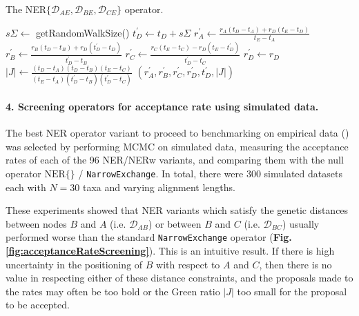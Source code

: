 \documentclass[10pt,letterpaper]{article}
\begin{document}
\begin{algorithm}
\caption{The NER$\{ \mathcal{D}_{AE}, \mathcal{D}_{BE}, \mathcal{D}_{CE} \}$ operator.}
\begin{algorithmic}[1]


	\State
    \State $s\Sigma \leftarrow $ getRandomWalkSize() 
    \State $t_D^\prime \leftarrow t_D + s\Sigma$ 
    \State
    \State $r_A^\prime \leftarrow \frac{r_A(t_D - t_A) + r_D(t_E - t_D)}{t_E - t_A}$ 
    \State $r_B^\prime \leftarrow \frac{r_B(t_D - t_B) + r_D(t_D^\prime - t_D)}{t_D^\prime - t_B}$
    \State $r_C^\prime \leftarrow \frac{r_C(t_E - t_C) - r_D(t_E - t_D^\prime)}{t_D^\prime - t_C}$
    \State $r_D^\prime \leftarrow r_D$
    \State
    \State $|J| \leftarrow \frac{(t_D - t_A)(t_D - t_B)(t_E - t_C)}{(t_E - t_A)(t_D^\prime - t_B)(t_D^\prime - t_C)}$ 
    \State \Return $(r_A^\prime, r_B^\prime, r_C^\prime, r_D^\prime, t_D^\prime, |J|)$
    
\EndProcedure

\end{algorithmic}
\label{alg:NER2}
\end{algorithm}





\paragraph{4. Screening operators for acceptance rate using simulated data.}


The best NER operator variant to proceed to benchmarking on empirical data (\textbf{}) was selected by  performing MCMC on simulated data, measuring the acceptance rates of each of the 96 NER/NERw variants, and comparing them with the null operator $\text{NER}\{\}$ / \texttt{NarrowExchange}. 
In total, there were 300 simulated datasets each with $N=30$ taxa and varying alignment lengths.



These experiments showed that NER variants which satisfy the genetic distances between nodes $B$ and $A$ (i.e. $\mathcal{D}_{AB}$) or between $B$ and $C$ (i.e. $\mathcal{D}_{BC}$) usually performed worse than the standard \texttt{NarrowExchange} operator (\textbf{Fig. \ref{fig:acceptanceRateScreening}}).
This is an intuitive result. 
If there is high uncertainty in the positioning of $B$ with respect to $A$ and $C$, then there is no value in respecting either of these distance constraints, and the proposals made to the rates may often be too bold or the Green ratio $|J|$ too small for the proposal to be accepted.
\end{document}
